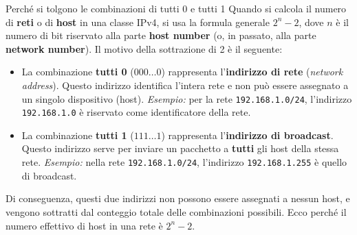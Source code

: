 \documentclass[a4paper,12pt]{report}
\begin{document}
\begin{notebox}{Perché si tolgono le combinazioni di tutti 0 e tutti 1}
Quando si calcola il numero di \textbf{reti} o di \textbf{host} in una classe IPv4, si usa la formula generale \(2^n - 2\), dove \(n\) è il numero di bit riservato alla parte \textbf{host number} (o, in passato, alla parte \textbf{network number}).  
Il motivo della sottrazione di 2 è il seguente:

\begin{itemize}
    \item La combinazione \textbf{tutti 0} (\(000\dots0\)) rappresenta l’\textbf{indirizzo di rete} (\textit{network address}).  
    Questo indirizzo identifica l’intera rete e non può essere assegnato a un singolo dispositivo (host).  
    \textit{Esempio:} per la rete \texttt{192.168.1.0/24}, l’indirizzo \texttt{192.168.1.0} è riservato come identificatore della rete.

    \item La combinazione \textbf{tutti 1} (\(111\dots1\)) rappresenta l’\textbf{indirizzo di broadcast}.  
    Questo indirizzo serve per inviare un pacchetto a \textbf{tutti} gli host della stessa rete.  
    \textit{Esempio:} nella rete \texttt{192.168.1.0/24}, l’indirizzo \texttt{192.168.1.255} è quello di broadcast.
\end{itemize}

Di conseguenza, questi due indirizzi non possono essere assegnati a nessun host, e vengono sottratti dal conteggio totale delle combinazioni possibili.  
Ecco perché il numero effettivo di host in una rete è \(2^n - 2\).
\end{notebox}
\end{document}
